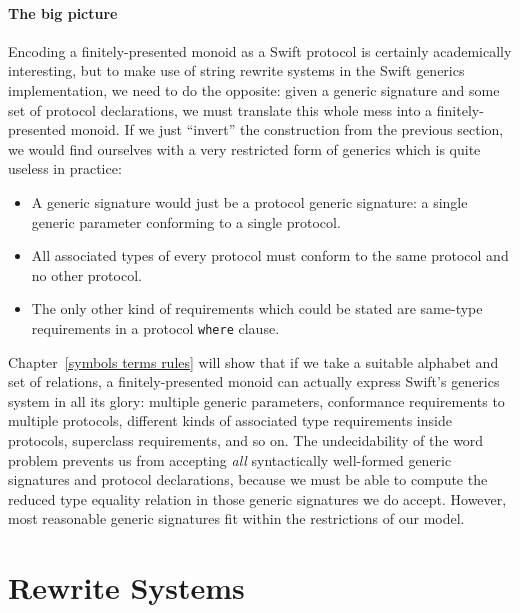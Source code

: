 \documentclass[../generics]{subfiles}
\begin{document}
\paragraph{The big picture} Encoding a finitely-presented monoid as a Swift protocol is certainly academically interesting, but to make use of string rewrite systems in the Swift generics implementation, we need to do the opposite: given a generic signature and some set of protocol declarations, we must translate this whole mess into a finitely-presented monoid. If we just ``invert'' the construction from the previous section, we would find ourselves with a very restricted form of generics which is quite useless in practice:
\begin{itemize}
\item A generic signature would just be a protocol generic signature: a single generic parameter conforming to a single protocol.
\item All associated types of every protocol must conform to the same protocol and no other protocol.
\item The only other kind of requirements which could be stated are same-type requirements in a protocol \texttt{where} clause.
\end{itemize}
Chapter~\ref{symbols terms rules} will show that if we take a suitable alphabet and set of relations, a finitely-presented monoid can actually express Swift's generics system in all its glory: multiple generic parameters, conformance requirements to multiple protocols, different kinds of associated type requirements inside protocols, superclass requirements, and so on. The undecidability of the word problem prevents us from accepting \emph{all} syntactically well-formed generic signatures and protocol declarations, because we must be able to compute the reduced type equality relation in those generic signatures we do accept. However, most reasonable generic signatures fit within the restrictions of our model.

\section{Rewrite Systems}\label{rewritesystemintro}
\end{document}
